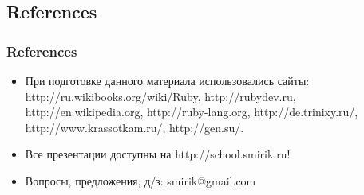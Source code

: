 \documentclass[compress,red]{beamer}
\begin{document}
\subsection{References}
\begin{frame}[fragile]
  \frametitle{References}
  \begin{itemize}
    \item При подготовке данного материала использовались сайты: http://ru.wikibooks.org/wiki/Ruby, http://rubydev.ru, http://en.wikipedia.org, http://ruby-lang.org, http://de.trinixy.ru/, http://www.krassotkam.ru/, http://gen.su/.
    \item Все презентации доступны на http://school.smirik.ru!
    \item Вопросы, предложения, д/з: smirik@gmail.com
  \end{itemize}
\end{frame}
\end{document}
